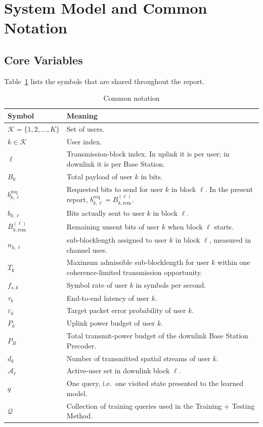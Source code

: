 \documentclass[11pt]{article}
\newcommand{\Kset}{\mathcal{K}}
\newcommand{\Aset}{\mathcal{A}}
\newcommand{\Qset}{\mathcal{Q}}
\begin{document}
\section{System Model and Common Notation}

\subsection{Core Variables}

Table~\ref{tab:common-notation} lists the symbols that are shared throughout
the report.

\begin{table}[ht]
\centering
\small
\caption{Common notation}
\label{tab:common-notation}
\renewcommand{\arraystretch}{1.15}
\begin{tabularx}{\textwidth}{>{\raggedright\arraybackslash}p{} X}
\toprule
Symbol & Meaning \\
\midrule
$\Kset = \{1,2,\dots,K\}$ & Set of users. \\
$k \in \Kset$ & User index. \\
$\ell$ & Transmission-block index. In uplink it is per user; in downlink it is per Base Station. \\
$B_k$ & Total payload of user $k$ in bits. \\
$b_{k,\ell}^{\mathrm{req}}$ & Requested bits to send for user $k$ in block $\ell$. In the present report, $b_{k,\ell}^{\mathrm{req}} = B_{k,\mathrm{rem}}^{(\ell)}$. \\
$b_{k,\ell}$ & Bits actually sent to user $k$ in block $\ell$. \\
$B_{k,\mathrm{rem}}^{(\ell)}$ & Remaining unsent bits of user $k$ when block $\ell$ starts. \\
$n_{k,\ell}$ & sub-blocklength assigned to user $k$ in block $\ell$, measured in channel uses. \\
$T_k$ & Maximum admissible sub-blocklength for user $k$ within one coherence-limited transmission opportunity. \\
$f_{s,k}$ & Symbol rate of user $k$ in symbols per second. \\
$\tau_k$ & End-to-end latency of user $k$. \\
$\varepsilon_k$ & Target packet error probability of user $k$. \\
$P_k$ & Uplink power budget of user $k$. \\
$P_B$ & Total transmit-power budget of the downlink Base Station Precoder. \\
$d_k$ & Number of transmitted spatial streams of user $k$. \\
$\Aset_\ell$ & Active-user set in downlink block $\ell$. \\
$q$ & One query, i.e.\ one visited state presented to the learned model. \\
$\Qset$ & Collection of training queries used in the Training + Testing Method. \\
\bottomrule
\end{tabularx}
\end{table}
\end{document}
